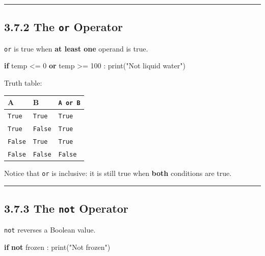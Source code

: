 \documentclass[
  11pt,
  a4paper,
]{article}
\newenvironment{Shaded}{}{}
\newcommand{\BuiltInTok}[1]{\textcolor[rgb]{0.00,0.50,0.00}{#1}}
\newcommand{\ControlFlowTok}[1]{\textcolor[rgb]{0.00,0.44,0.13}{\textbf{#1}}}
\newcommand{\DecValTok}[1]{\textcolor[rgb]{0.25,0.63,0.44}{#1}}
\newcommand{\KeywordTok}[1]{\textcolor[rgb]{0.00,0.44,0.13}{\textbf{#1}}}
\newcommand{\NormalTok}[1]{#1}
\newcommand{\OperatorTok}[1]{\textcolor[rgb]{0.40,0.40,0.40}{#1}}
\newcommand{\StringTok}[1]{\textcolor[rgb]{0.25,0.44,0.63}{#1}}
\begin{document}
\begin{center}\rule{0.5\linewidth}{0.5pt}\end{center}

\subsection{\texorpdfstring{3.7.2 The \texttt{or}
Operator}{3.7.2 The or Operator}}\label{the-or-operator}

\texttt{or} is true when \textbf{at least one} operand is true.

\begin{Shaded}
\begin{Highlighting}[]
\ControlFlowTok{if}\NormalTok{ temp }\OperatorTok{\textless{}=} \DecValTok{0} \KeywordTok{or}\NormalTok{ temp }\OperatorTok{\textgreater{}=} \DecValTok{100}\NormalTok{ :}
    \BuiltInTok{print}\NormalTok{(}\StringTok{"Not liquid water"}\NormalTok{)}
\end{Highlighting}
\end{Shaded}

Truth table:

\begin{longtable}[]{@{}lll@{}}
\toprule\noalign{}
A & B & \texttt{A\ or\ B} \\
\midrule\noalign{}
\endhead
\bottomrule\noalign{}
\endlastfoot
\texttt{True} & \texttt{True} & \texttt{True} \\
\texttt{True} & \texttt{False} & \texttt{True} \\
\texttt{False} & \texttt{True} & \texttt{True} \\
\texttt{False} & \texttt{False} & \texttt{False} \\
\end{longtable}

Notice that \texttt{or} is inclusive: it is still true when
\textbf{both} conditions are true.

\begin{center}\rule{0.5\linewidth}{0.5pt}\end{center}

\subsection{\texorpdfstring{3.7.3 The \texttt{not}
Operator}{3.7.3 The not Operator}}\label{the-not-operator}

\texttt{not} reverses a Boolean value.

\begin{Shaded}
\begin{Highlighting}[]
\ControlFlowTok{if} \KeywordTok{not}\NormalTok{ frozen :}
    \BuiltInTok{print}\NormalTok{(}\StringTok{"Not frozen"}\NormalTok{)}
\end{Highlighting}
\end{Shaded}
\end{document}
